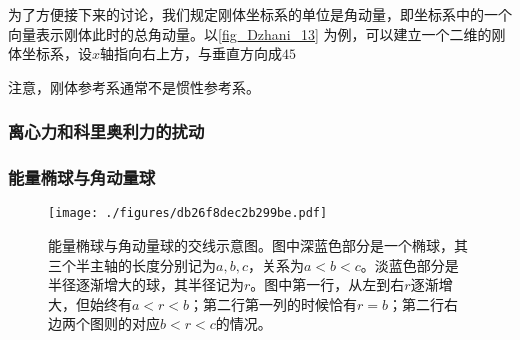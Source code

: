 为了方便接下来的讨论，我们规定刚体坐标系的单位是角动量，即坐标系中的一个向量表示刚体此时的总角动量。以\autoref{fig_Dzhani_13} 为例，可以建立一个二维的刚体坐标系，设$x$轴指向右上方，与垂直方向成$45$


注意，刚体参考系通常不是惯性参考系。




\subsubsection{离心力和科里奥利力的扰动}







\subsubsection{能量椭球与角动量球}


\begin{figure}[ht]
\centering
\texttt{[image: ./figures/db26f8dec2b299be.pdf]}
\caption{能量椭球与角动量球的交线示意图。图中深蓝色部分是一个椭球，其三个半主轴的长度分别记为$a, b, c$，关系为$a<b<c$。淡蓝色部分是半径逐渐增大的球，其半径记为$r$。图中第一行，从左到右$r$逐渐增大，但始终有$a<r<b$；第二行第一列的时候恰有$r=b$；第二行右边两个图则的对应$b<r<c$的情况。} \label{fig_Dzhani_7}
\end{figure}


















